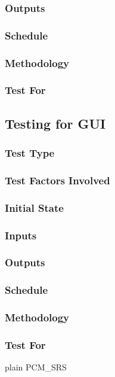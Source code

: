 \documentclass[12pt]{article}
\begin{document}
\subsubsection*{Outputs}
\subsubsection*{Schedule}
\subsubsection*{Methodology}
\subsubsection*{Test For}

\subsection{Testing for GUI}

\subsubsection*{Test Type}
\subsubsection*{Test Factors Involved}
\subsubsection*{Initial State}
\subsubsection*{Inputs}
\subsubsection*{Outputs}
\subsubsection*{Schedule}
\subsubsection*{Methodology}
\subsubsection*{Test For}




 {plain}
 {PCM_SRS}
\end{document}
